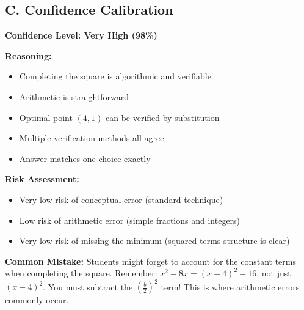 \documentclass[12pt]{article}
\begin{document}
\begin{verificationbox}
\subsection*{C. Confidence Calibration}

\textbf{Confidence Level: Very High (98\%)}

\textbf{Reasoning:}
\begin{itemize}
    \item Completing the square is algorithmic and verifiable
    \item Arithmetic is straightforward
    \item Optimal point $(4, 1)$ can be verified by substitution
    \item Multiple verification methods all agree
    \item Answer matches one choice exactly
\end{itemize}

\textbf{Risk Assessment:}
\begin{itemize}
    \item Very low risk of conceptual error (standard technique)
    \item Low risk of arithmetic error (simple fractions and integers)
    \item Very low risk of missing the minimum (squared terms structure is clear)
\end{itemize}
\end{verificationbox}

\vspace{1em}

\begin{warningbox}
\textbf{Common Mistake:} Students might forget to account for the constant terms when completing the square. Remember: $x^2 - 8x = (x - 4)^2 - 16$, not just $(x - 4)^2$. You must subtract the $(\frac{b}{2})^2$ term! This is where arithmetic errors commonly occur.
\end{warningbox}

\vspace{1em}
\end{document}
